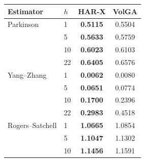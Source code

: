 \begin{tabular}{ll cc}
\toprule
Estimator & $h$ & HAR-X & VolGA \\
\midrule
Parkinson & 1 & \textbf{0.5115} & 0.5504 \\
 & 5 & \textbf{0.5633} & 0.5759 \\
 & 10 & \textbf{0.6023} & 0.6103 \\
 & 22 & \textbf{0.6405} & 0.6576 \\
\midrule
Yang--Zhang & 1 & \textbf{0.0062} & 0.0080 \\
 & 5 & \textbf{0.0651} & 0.0774 \\
 & 10 & \textbf{0.1700} & 0.2396 \\
 & 22 & \textbf{0.2983} & 0.4518 \\
\midrule
Rogers--Satchell & 1 & \textbf{1.0665} & 1.0854 \\
 & 5 & \textbf{1.1047} & 1.1302 \\
 & 10 & \textbf{1.1456} & 1.1591 \\
\bottomrule
\end{tabular}
